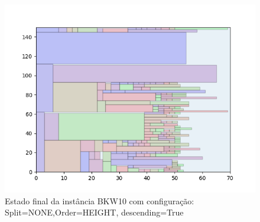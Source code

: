 \begin{figure}[H]
    \centering
    \caption[]{Estado final da instância BKW10 com configuração: Split=NONE,Order=HEIGHT, descending=True}
    \label{fig:bkw10-none-height-true}
    \includegraphics[scale=0.5]{output/figures/bkw/bkw10/none/height/true/000}
\end{figure}